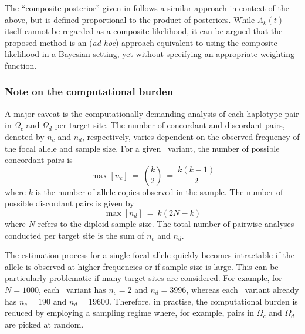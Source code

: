 The ``composite posterior'' given in  follows a similar approach in context of the above, but is defined proportional to the product of posteriors.
While ${\Lambda_k(t)}$ itself cannot be regarded as a composite likelihood, it can be argued that the proposed method is an (\emph{ad hoc}) approach equivalent to using the composite likelihood in a Bayesian setting, yet without specifying an appropriate weighting function.



%
\subsubsection{Note on the computational burden}
%

A major caveat is the computationally demanding analysis of each haplotype pair in $\Omega_c$ and $\Omega_d$ per target site.
The number of concordant and discordant pairs, denoted by $n_c$ and $n_d$, respectively, varies dependent on the observed frequency of the focal allele and sample size.
For a given \fk{}~variant, the number of possible concordant pairs is
\begin{equation}\label{eq:age_nc}
	\max[n_c] ~=~ {{k}\choose{2}} ~=~ \frac{k(k-1)}{2}
\end{equation}
where $k$ is the number of allele copies observed in the sample.
The number of possible discordant pairs is given by
\begin{equation}\label{eq:age_nd}
	\max[n_d] ~=~ k(2N-k)
\end{equation}
where $N$ refers to the diploid sample size.
The total number of pairwise analyses conducted per target site is the sum of $n_c$ and $n_d$.

The estimation process for a single focal allele quickly becomes intractable if the allele is observed at higher frequencies or if sample size is large.
This can be particularly problematic if many target sites are considered.
For example, for ${N=\num{1000}}$, each ~variant has ${n_c=2}$ and ${n_d=\num{3996}}$, whereas each ~variant already has ${n_c=\num{190}}$ and ${n_d=\num{19600}}$.
Therefore, in practise, the computational burden is reduced by employing a sampling regime where, for example, pairs in $\Omega_c$ and $\Omega_d$ are picked at random.





